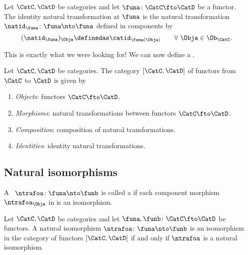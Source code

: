 \begin{ctdefinition}\label{def:identity-natural-transformation}
    Let $\CatC, \CatD$ be categories and let $\funa \colon \CatC \fto \CatD$ be a functor.
    The identity natural transformation at $\funa$ is the natural transformation $\natid_\funa \colon \funa \nto \funa$ defined in components by
    \begin{equation}\label{eq:identity-nat-trafo-def}
        (\natid_\funa)_\Obja \definedas \catid_{\funa(\Obja)} \quad \quad \forall \ \Obja \in \Ob_\CatC.
    \end{equation}
\end{ctdefinition}

This is exactly what we were looking for! We can now define a . 

\begin{ctdefinition}\label{def:category-of-functors}
    Let $\CatC, \CatD$ be categories.
    The category $[\CatC, \CatD]$ of functors from $\CatC$ to $\CatD$ is given by
    \begin{enumerate}
        \item \emph{Objects}: functors $\CatC \fto \CatD$.
        \item \emph{Morphisms}: natural transformations between functors $\CatC \fto \CatD$.
        \item \emph{Composition}: composition of natural transformations.
        \item \emph{Identities}: identity natural transformations.
    \end{enumerate}
\end{ctdefinition}




\subsection{Natural isomorphisms}

\begin{ctdefinition}
    \label{def:natural-isomorphism}
    A ~$\ntrafoa \colon \funa \nto \funb $ is called a  if each component morphism ~$\ntrafoa_\Obja$ in \CatD is an isomorphism.
\end{ctdefinition}

\begin{lemma}
    Let $\CatC, \CatD$ be categories and let $\funa, \funb \colon \CatC \fto \CatD$ be functors.
    A natural isomorphism $\ntrafoa \colon \funa \nto \funb $ is an isomorphism in the category of functors $[\CatC, \CatD]$ if and only if $\ntrafoa$ is a natural isomorphism.
\end{lemma}

